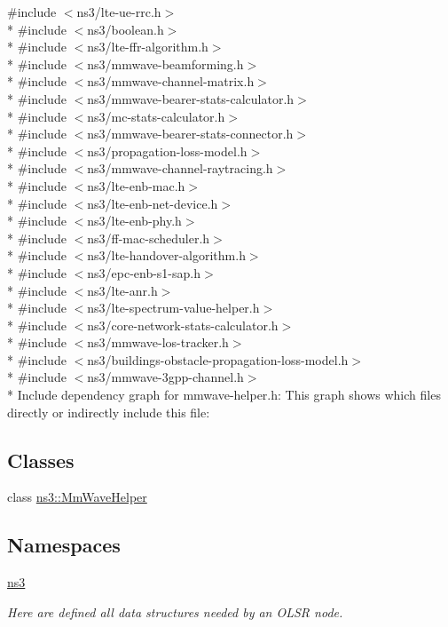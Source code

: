 {\ttfamily \#include $<$ns3/lte-\/ue-\/rrc.\+h$>$}\\*
{\ttfamily \#include $<$ns3/boolean.\+h$>$}\\*
{\ttfamily \#include $<$ns3/lte-\/ffr-\/algorithm.\+h$>$}\\*
{\ttfamily \#include $<$ns3/mmwave-\/beamforming.\+h$>$}\\*
{\ttfamily \#include $<$ns3/mmwave-\/channel-\/matrix.\+h$>$}\\*
{\ttfamily \#include $<$ns3/mmwave-\/bearer-\/stats-\/calculator.\+h$>$}\\*
{\ttfamily \#include $<$ns3/mc-\/stats-\/calculator.\+h$>$}\\*
{\ttfamily \#include $<$ns3/mmwave-\/bearer-\/stats-\/connector.\+h$>$}\\*
{\ttfamily \#include $<$ns3/propagation-\/loss-\/model.\+h$>$}\\*
{\ttfamily \#include $<$ns3/mmwave-\/channel-\/raytracing.\+h$>$}\\*
{\ttfamily \#include $<$ns3/lte-\/enb-\/mac.\+h$>$}\\*
{\ttfamily \#include $<$ns3/lte-\/enb-\/net-\/device.\+h$>$}\\*
{\ttfamily \#include $<$ns3/lte-\/enb-\/phy.\+h$>$}\\*
{\ttfamily \#include $<$ns3/ff-\/mac-\/scheduler.\+h$>$}\\*
{\ttfamily \#include $<$ns3/lte-\/handover-\/algorithm.\+h$>$}\\*
{\ttfamily \#include $<$ns3/epc-\/enb-\/s1-\/sap.\+h$>$}\\*
{\ttfamily \#include $<$ns3/lte-\/anr.\+h$>$}\\*
{\ttfamily \#include $<$ns3/lte-\/spectrum-\/value-\/helper.\+h$>$}\\*
{\ttfamily \#include $<$ns3/core-\/network-\/stats-\/calculator.\+h$>$}\\*
{\ttfamily \#include $<$ns3/mmwave-\/los-\/tracker.\+h$>$}\\*
{\ttfamily \#include $<$ns3/buildings-\/obstacle-\/propagation-\/loss-\/model.\+h$>$}\\*
{\ttfamily \#include $<$ns3/mmwave-\/3gpp-\/channel.\+h$>$}\\*
Include dependency graph for mmwave-\/helper.h\+:
This graph shows which files directly or indirectly include this file\+:
\subsection*{Classes}
\begin{DoxyCompactItemize}
\item 
class \hyperlink{classns3_1_1MmWaveHelper}{ns3\+::\+Mm\+Wave\+Helper}
\end{DoxyCompactItemize}
\subsection*{Namespaces}
\begin{DoxyCompactItemize}
\item 
 \hyperlink{namespacens3}{ns3}
\begin{DoxyCompactList}\small\item\em Here are defined all data structures needed by an O\+L\+SR node. \end{DoxyCompactList}\end{DoxyCompactItemize}
